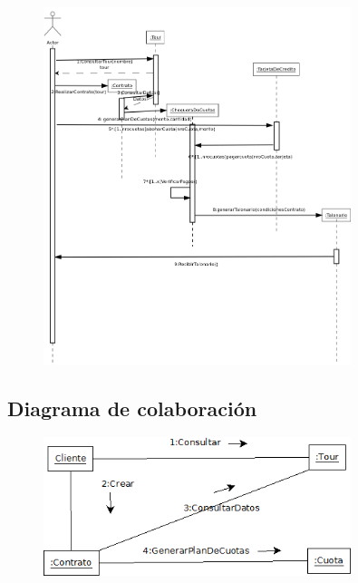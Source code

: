 \documentclass[12pt,a4paper,titlepage,oneside]{article}
\begin{document}
 
\begin{figure}[htb]
\centerline{\includegraphics[width=0.8\textwidth]{SecuenciaV2}}
\label{fig:celda}
\end{figure}  

\newpage
\subsection{Diagrama de colaboración} 


\begin{figure}[htb]
\centerline{\includegraphics[width=0.8\textwidth]{colaboracion}}
\label{fig:celda}
\end{figure}  


 
\end{document}
